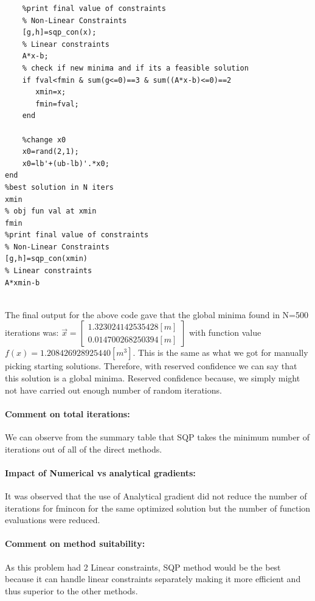 \documentclass[12pt]{article}
\begin{document}
\begin{enumerate}[I]
\begin{enumerate}[1)]
\begin{lstlisting}
    %print final value of constraints
    % Non-Linear Constraints
    [g,h]=sqp_con(x);
    % Linear constraints
    A*x-b;    
    % check if new minima and if its a feasible solution        
    if fval<fmin & sum(g<=0)==3 & sum((A*x-b)<=0)==2
       xmin=x;
       fmin=fval;
    end
    
    %change x0
    x0=rand(2,1);
    x0=lb'+(ub-lb)'.*x0;
end
%best solution in N iters
xmin
% obj fun val at xmin
fmin
%print final value of constraints
% Non-Linear Constraints
[g,h]=sqp_con(xmin)
% Linear constraints
A*xmin-b
\end{lstlisting}\\

The final output for the above code gave that the global minima found in N=500 iterations was:
$\vec{x}=\begin{bmatrix}1.323024142535428 [m]\\ 0.014700268250394[m]\end{bmatrix}$ with function value $f(x)=1.208426928925440 [m^3]$. This is the same as what we got for manually picking starting solutions. Therefore, with reserved confidence we can say that this solution is a global minima. Reserved confidence because, we simply might not have carried out enough number of random iterations.

\paragraph{Comment on total iterations:} We can observe from the summary table that SQP takes the minimum number of iterations out of all of the direct methods.

\paragraph{Impact of Numerical vs analytical gradients:} It was observed that the use of Analytical gradient did not reduce the number of iterations for fmincon for the same optimized solution but the number of function evaluations were reduced. 

\paragraph{Comment on method suitability:} As this problem had 2 Linear constraints, SQP method would be the best because it can handle linear constraints separately making it more efficient and thus superior to the other methods.


\end{enumerate}
\end{enumerate}
\end{document}
